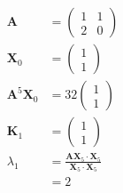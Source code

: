 \documentclass{article}
\begin{document}
\begin{align*}
  \mathbf{A}                & = \begin{pmatrix}
                                  1 & 1 \\
                                  2 & 0
                                \end{pmatrix}                                                                     \\
  \mathbf{X}_0              & = \begin{pmatrix}
                                  1 \\
                                  1
                                \end{pmatrix}                                                                     \\
  \mathbf{A}^5 \mathbf{X}_0 & = 32\begin{pmatrix}
                                    1 \\
                                    1
                                  \end{pmatrix}                                                                   \\
  \mathbf{K}_1              & = \begin{pmatrix}
                                  1 \\
                                  1
                                \end{pmatrix}                                                                     \\
  \lambda_1                 & = \frac{\mathbf{A} \mathbf{X}_5 \cdot \mathbf{X}_5}{\mathbf{X}_5 \cdot \mathbf{X}_5} \\
                            & = 2
\end{align*}

\setcounter{subsubsection}{2}
\subsubsection{}
\end{document}
